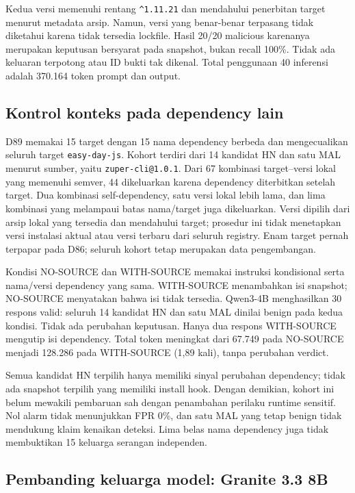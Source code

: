 Kedua versi memenuhi rentang \texttt{\textasciicircum1.11.21} dan
mendahului penerbitan target menurut metadata arsip. Namun, versi yang
benar-benar terpasang tidak diketahui karena tidak tersedia lockfile.
Hasil 20/20 malicious karenanya merupakan keputusan bersyarat pada snapshot,
bukan recall 100\%. Tidak ada keluaran terpotong atau ID bukti tak dikenal.
Total penggunaan 40 inferensi adalah 370.164 token prompt dan output.

\subsection{Kontrol konteks pada dependency lain}
\label{sec:dependency-generalization}

D89 memakai 15 target dengan 15 nama dependency berbeda dan mengecualikan
seluruh target \texttt{easy-day-js}. Kohort terdiri dari 14 kandidat HN dan
satu MAL menurut sumber, yaitu \texttt{zuper-cli@1.0.1}. Dari 67 kombinasi
target--versi lokal yang memenuhi semver, 44 dikeluarkan karena dependency
diterbitkan setelah target. Dua kombinasi self-dependency, satu versi lokal
lebih lama, dan lima kombinasi yang melampaui batas nama/target juga
dikeluarkan. Versi dipilih dari arsip lokal yang tersedia dan mendahului
target; prosedur ini tidak menetapkan versi instalasi aktual atau versi
terbaru dari seluruh registry. Enam target pernah terpapar pada D86;
seluruh kohort tetap merupakan data pengembangan.

Kondisi NO-SOURCE dan WITH-SOURCE memakai instruksi kondisional serta
nama/versi dependency yang sama. WITH-SOURCE menambahkan isi snapshot;
NO-SOURCE menyatakan bahwa isi tidak tersedia. Qwen3-4B menghasilkan
30 respons valid: seluruh 14 kandidat HN dan satu MAL dinilai benign pada
kedua kondisi. Tidak ada perubahan keputusan. Hanya dua respons WITH-SOURCE
mengutip isi dependency. Total token meningkat dari 67.749 pada NO-SOURCE
menjadi 128.286 pada WITH-SOURCE (1,89 kali), tanpa perubahan verdict.

Semua kandidat HN terpilih hanya memiliki sinyal perubahan dependency;
tidak ada snapshot terpilih yang memiliki install hook. Dengan demikian,
kohort ini belum mewakili pembaruan sah dengan penambahan perilaku runtime
sensitif. Nol alarm tidak menunjukkan FPR 0\%, dan satu MAL yang tetap
benign tidak mendukung klaim kenaikan deteksi. Lima belas nama dependency
juga tidak membuktikan 15 keluarga serangan independen.

\subsection{Pembanding keluarga model: Granite 3.3 8B}
\label{sec:granite-comparison}

